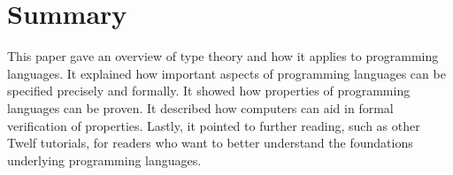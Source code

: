 \section{Summary}
\label{sec:summary}
This paper gave an overview of type theory and how it applies
to programming languages.
It explained how important aspects of programming languages
can be specified precisely and formally.
It showed how properties of programming languages can be proven.
It described how computers can aid in formal verification
of properties.
Lastly, it pointed to further reading, such as other
Twelf tutorials, for readers who want to better understand
the foundations underlying programming languages.

